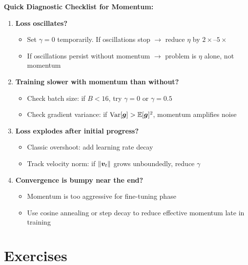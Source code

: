 \documentclass[../../main.tex]{subfiles}
\begin{document}
\begin{important}
\textbf{Quick Diagnostic Checklist for Momentum:}

\begin{enumerate}
    \item \textbf{Loss oscillates?}
    \begin{itemize}
        \item Set $\gamma = 0$ temporarily. If oscillations stop $\rightarrow$ reduce $\eta$ by $2\times$--$5\times$
        \item If oscillations persist without momentum $\rightarrow$ problem is $\eta$ alone, not momentum
    \end{itemize}

    \item \textbf{Training slower with momentum than without?}
    \begin{itemize}
        \item Check batch size: if $B < 16$, try $\gamma = 0$ or $\gamma = 0.5$
        \item Check gradient variance: if $\operatorname{Var}[\boldsymbol{g}] > \operatorname{\mathbb{E}}[\boldsymbol{g}]^2$, momentum amplifies noise
    \end{itemize}

    \item \textbf{Loss explodes after initial progress?}
    \begin{itemize}
        \item Classic overshoot: add learning rate decay
        \item Track velocity norm: if $\left\lVert \boldsymbol{v}_t \right\rVert$ grows unboundedly, reduce $\gamma$
    \end{itemize}

    \item \textbf{Convergence is bumpy near the end?}
    \begin{itemize}
        \item Momentum is too aggressive for fine-tuning phase
        \item Use cosine annealing or step decay to reduce effective momentum late in training
    \end{itemize}
\end{enumerate}
\end{important}

\section{Exercises}
\label{sec:ch11-exercises}
\end{document}
